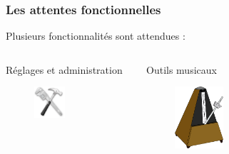 \begin{frame}
\begin{columns}[t]
\begin{column}{.5\textwidth}
    \end{column}
    
  \end{columns}

\end{frame}

\begin{frame}
  \frametitle{Les attentes fonctionnelles}

  \centering \Large Plusieurs fonctionnalités sont attendues :
\bigskip
  \begin{columns}[t]
    \begin{column}{0.5\textwidth}

      \centering \large Réglages et administration
      \begin{figure}[!h]
        \bigskip
        \begin{center}
          \includegraphics[width = 0.45\textwidth]{presentation/admin.png}
        \end{center}
      \end{figure}
    \end{column}
    \begin{column}{0.5\textwidth}
      \centering \large Outils musicaux
      \begin{figure}[!h]
        \begin{center}
          \includegraphics[width = 0.3\textwidth]{presentation/outils1.png}
        \end{center}
      \end{figure}
      

\end{column}
\end{columns}
\end{frame}

